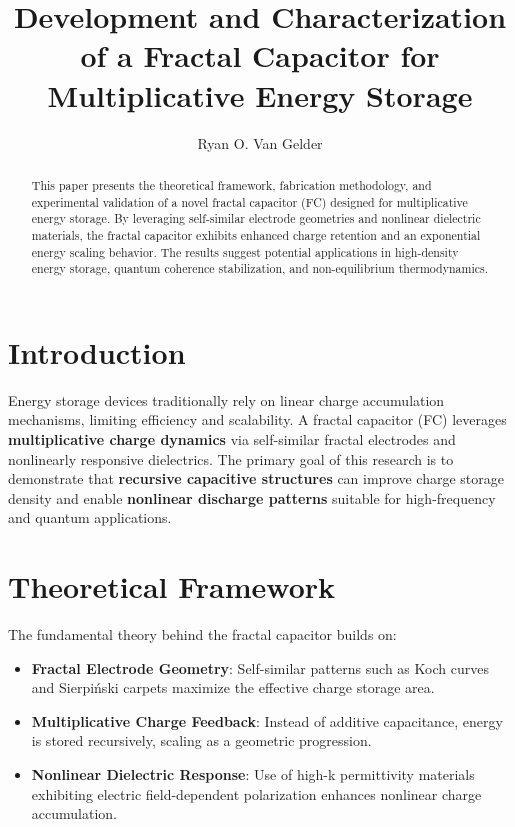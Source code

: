 \documentclass{article}
\theoremstyle{plain}
\begin{document}
\title{Development and Characterization of a Fractal Capacitor for Multiplicative Energy Storage}
\author{Ryan O. Van Gelder}
\maketitle
\nolinenumbers
\begin{abstract}
    This paper presents the theoretical framework, fabrication methodology, and experimental validation of a novel fractal capacitor (FC) designed for multiplicative energy storage. By leveraging self-similar electrode geometries and nonlinear dielectric materials, the fractal capacitor exhibits enhanced charge retention and an exponential energy scaling behavior. The results suggest potential applications in high-density energy storage, quantum coherence stabilization, and non-equilibrium thermodynamics.
\end{abstract}

\section{Introduction}
Energy storage devices traditionally rely on linear charge accumulation mechanisms, limiting efficiency and scalability. A fractal capacitor (FC) leverages \textbf{multiplicative charge dynamics} via self-similar fractal electrodes and nonlinearly responsive dielectrics. The primary goal of this research is to demonstrate that \textbf{recursive capacitive structures} can improve charge storage density and enable \textbf{nonlinear discharge patterns} suitable for high-frequency and quantum applications.

\section{Theoretical Framework}
The fundamental theory behind the fractal capacitor builds on:
\begin{itemize}
    \item \textbf{Fractal Electrode Geometry}: Self-similar patterns such as Koch curves and Sierpiński carpets maximize the effective charge storage area.
    \item \textbf{Multiplicative Charge Feedback}: Instead of additive capacitance, energy is stored recursively, scaling as a geometric progression.
    \item \textbf{Nonlinear Dielectric Response}: Use of high-k permittivity materials exhibiting electric field-dependent polarization enhances nonlinear charge accumulation.
\end{itemize}
\end{document}

